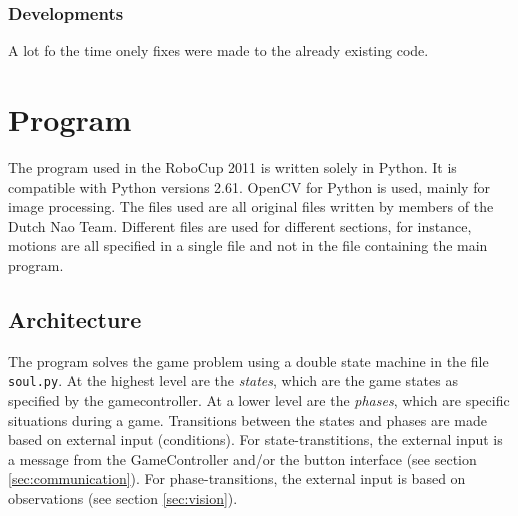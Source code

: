 \documentclass[11pt,a4paper,oneside]{article}
\begin{document}
\subsubsection{Developments}
A lot fo the time onely fixes were made to the already existing code.




\section{Program}
The program used in the RoboCup 2011 is written solely in Python. It is compatible with Python versions 2.61. OpenCV for Python is used, mainly for image processing. The files used are all original files written by members of the Dutch Nao Team. Different files are used for different sections, for instance, motions are all specified in a single file and not in the file containing the main program.
\subsection{Architecture}
\label{sec:architecture}
The program solves the game problem using a double state machine in the file \texttt{soul.py}. At the highest level are the \textit{states}, which are the game states as specified by the gamecontroller. 
At a lower level are the \textit{phases}, which are specific situations during a game. Transitions between the states and phases are made based on external input (conditions). 
For state-transtitions, the external input is a message from the GameController and/or the button interface (see section \ref{sec:communication}). 
For phase-transitions, the external input is based on observations (see section \ref{sec:vision}). 

\end{document}
